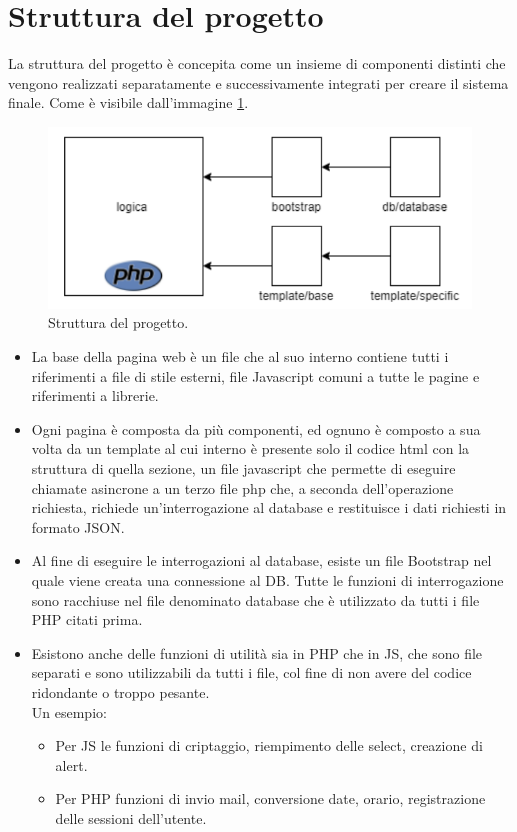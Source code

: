 \documentclass[a4paper,final,12pt]{report}
\begin{document}
\section{Struttura del progetto}
La struttura del progetto è concepita come un insieme di componenti distinti che vengono realizzati separatamente e successivamente integrati per creare il sistema finale. Come è visibile dall'immagine \ref{figura:partidellastrutturadelprog}.
\begin{figure}[hbtp]
\centering
\includegraphics[scale=0.80]{img_concettuale/struttura.png}
\caption{Struttura del progetto.}
\label{figura:partidellastrutturadelprog}
\end{figure}
\begin{itemize}
\item La base della pagina web è un file che al suo interno contiene tutti i riferimenti a file di stile esterni, file Javascript comuni a tutte le pagine e riferimenti a librerie.
\item Ogni pagina è composta da più componenti, ed ognuno è composto a sua volta da un template al cui interno è presente solo il codice html con la struttura di quella sezione, un file javascript che permette di eseguire chiamate asincrone a un terzo file php che, a seconda dell'operazione richiesta, richiede un'interrogazione al database e restituisce i dati richiesti in formato JSON.
\item Al fine di eseguire le interrogazioni al database, esiste un file Bootstrap nel quale viene creata una connessione al DB.
Tutte le funzioni di interrogazione sono racchiuse nel file denominato database che è utilizzato da tutti i file PHP citati prima.
\item Esistono anche delle funzioni di utilità sia in PHP che in JS, che sono file separati e sono utilizzabili da tutti i file, col fine di non avere del codice ridondante o troppo pesante.\\ Un esempio:
\begin{itemize}
 \item Per JS le funzioni di criptaggio, riempimento delle select, creazione di alert.
 \item Per PHP funzioni di invio mail, conversione date, orario, registrazione delle sessioni dell'utente. 
 \end{itemize} 
\end{itemize}
\end{document}
